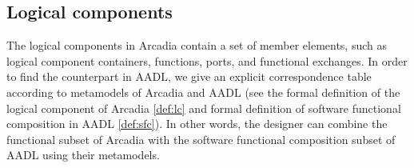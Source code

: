 \subsection{Logical components}
\begin{table}[h]
\vskip 0.5cm
\caption{Functional elements corresponding table}
\label{tab:funcionalT}
\end{table}

The logical components in Arcadia contain a set of member elements, such as logical component containers, functions, ports, and functional exchanges. In order to find the counterpart in AADL, we give an explicit correspondence table according to metamodels of Arcadia and AADL (see the formal definition of the logical component of Arcadia \ref{def:lc} and formal definition of software functional composition in AADL \ref{def:sfc}). In other words, the designer can combine the functional subset of Arcadia with the software functional composition subset of AADL using their metamodels. 




